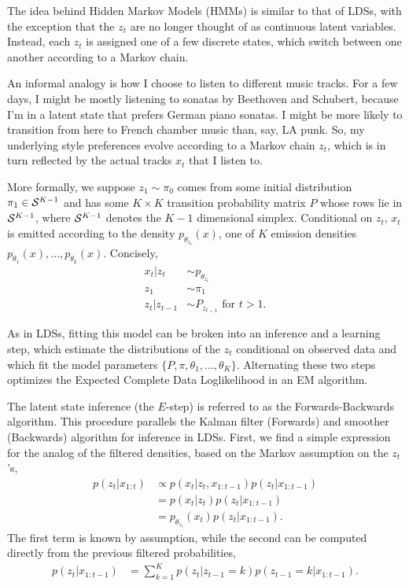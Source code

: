 \documentclass{article}
\begin{document}
The idea behind Hidden Markov Models (HMMs) is similar to that of LDSs, with the
exception that the $z_{t}$ are no longer thought of as continuous latent
variables. Instead, each $z_{t}$ is assigned one of a few discrete states,
which switch between one another according to a Markov chain.

An informal analogy is how I choose to listen to different music tracks. For a
few days, I might be mostly listening to sonatas by Beethoven and Schubert,
because I'm in a latent state that prefers German piano sonatas. I might be more
likely to transition from here to French chamber music than, say, LA punk. So,
my underlying style preferences evolve according to a Markov chain $z_{t}$,
which is in turn reflected by the actual tracks $x_{t}$ that I listen to.

More formally, we suppose $z_{1} \sim \pi_{0}$ comes from some initial
distribution $\pi_{1} \in \mathcal{S}^{K - 1}$ and has some $K \times K$ transition
probability matrix $P$ whose rows lie in $\mathcal{S}^{K - 1}$, where $\mathcal{S}^{K
  - 1}$ denotes the $K - 1$ dimensional simplex. Conditional on $z_{t}$, $x_{t}$
is emitted according to the density $p_{\theta_{z_{t}}}\left(x\right)$, one of
$K$ emission densities $p_{\theta_{1}}\left(x\right), \dots,
p_{\theta_{k}}\left(x\right)$. Concisely,
\begin{align*}
  x_{t} \vert z_{t} &\sim p_{\theta_{z_{t}}} \\
  z_{1} &\sim \pi_{1} \\
  z_{t} \vert z_{t - 1} &\sim P_{z_{t - 1}} \text{ for } t > 1.
\end{align*}

As in LDSs, fitting this model can be broken into an inference and a learning
step, which estimate the distributions of the $z_{t}$ conditional on observed
data and which fit the model parameters $\{P, \pi, \theta_{1}, \dots,
\theta_{K}\}$. Alternating these two steps optimizes the Expected Complete Data
Loglikelihood in an EM algorithm.

The latent state inference (the $E$-step) is referred to as the
Forwards-Backwards algorithm. This procedure parallels the Kalman filter
(Forwards) and smoother (Backwards) algorithm for inference in LDSs. First,
we find a simple expression for the analog of the filtered densities, based on
the Markov assumption on the $z_{t}$'s,
\begin{align*}
  p\left(z_{t} \vert x_{1:t}\right) &\propto p\left(x_{t} \vert z_{t}, x_{1:t - 1}\right) p\left(z_{t} \vert x_{1:t - 1}\right) \\
  &= p\left(x_{t} \vert z_{t}\right) p\left(z_{t} \vert x_{1:t - 1}\right) \\
  &= p_{\theta_{z_{t}}}\left(x_{t}\right)p\left(z_{t} \vert x_{1:t - 1}\right).
\end{align*}
The first term is known by assumption, while the second can be computed directly
from the previous filtered probabilities,
\begin{align*}
  p\left(z_{t} \vert x_{1:t - 1}\right) &= \sum_{k = 1}^{K} p\left(z_{t} \vert z_{t - 1} = k\right)p\left(z_{t - 1} = k \vert x_{1:t - 1} \right).
\end{align*}
\end{document}
